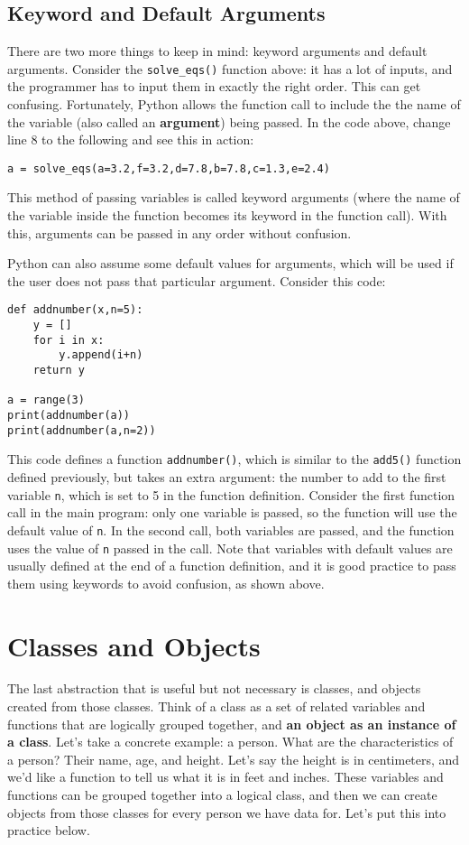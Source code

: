 \documentclass[12pt]{article}
\newcommand{\code}{\texttt}
\begin{document}
\subsection{Keyword and Default Arguments}

There are two more things to keep in mind: keyword arguments and default arguments. Consider the \code{solve\_eqs()} function above: it has a lot of inputs, and the programmer has to input them in exactly the right order. This can get confusing. Fortunately, Python allows the function call to include the the name of the variable (also called an \textbf{argument}) being passed. In the code above, change line 8 to the following and see this in action:

\begin{lstlisting}[frame=single] 
a = solve_eqs(a=3.2,f=3.2,d=7.8,b=7.8,c=1.3,e=2.4)
\end{lstlisting}

This method of passing variables is called keyword arguments (where the name of the variable inside the function becomes its keyword in the function call). With this, arguments can be passed in any order without confusion. 

Python can also assume some default values for arguments, which will be used if the user does not pass that particular argument. Consider this code:

\begin{lstlisting}[frame=single] 
def addnumber(x,n=5):
    y = []
    for i in x:
        y.append(i+n)
    return y

a = range(3)
print(addnumber(a))
print(addnumber(a,n=2))
\end{lstlisting}

This code defines a function \code{addnumber()}, which is similar to the \code{add5()} function defined previously, but takes an extra argument: the number to add to the first variable \code{n}, which is set to 5 in the function definition. Consider the first function call in the main program: only one variable is passed, so the function will use the default value of \code{n}. In the second call, both variables are passed, and the function uses the value of \code{n} passed in the call. Note that variables with default values are usually defined at the end of a function definition, and it is good practice to pass them using keywords to avoid confusion, as shown above.

\newpage
\section{Classes and Objects}
The last abstraction that is useful but not necessary is classes, and objects created from those classes. Think of a class as a set of related variables and functions that are logically grouped together, and \textbf{an object as an instance of a class}. Let's take a concrete example: a person. What are the characteristics of a person? Their name, age, and height. Let's say the height is in centimeters, and we'd like a function to tell us what it is in feet and inches. These variables and functions can be grouped together into a logical class, and then we can create objects from those classes for every person we have data for. Let's put this into practice below. 
\end{document}
